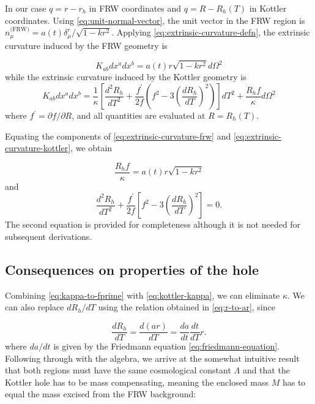 In our case $q = r-r_h$ in FRW coordinates and $q = R - R_h(T)$ in Kottler coordinates. Using \autoref{eq:unit-normal-vector}, the unit vector in the FRW region is $n_{\mu}^{\text{(FRW)}} = a(t) \delta^r_{\mu}/\sqrt{1-kr^2}$. Applying \autoref{eq:extrinsic-curvature-defn}, the extrinsic curvature induced by the FRW geometry is

\begin{equation}
  K_{ab} dx^a dx^b = a(t)r \sqrt{1-kr^2} d \Omega^2
  \label{eq:extrinsic-curvature-frw}
\end{equation}
while the extrinsic curvature induced by the Kottler geometry is
\begin{equation}
  K_{ab} dx^a dx^b = \frac{1}{\kappa} \left [ \frac{d^2R_h}{dT^2} + \frac{f^{\prime}}{2f}\left (f^2 - 3 \left (\frac{dR_h}{dT}\right )^2 \right) \right] dT^2 + \frac{R_h f}{\kappa} d \Omega^2
  \label{eq:extrinsic-curvature-kottler}
\end{equation}
where $f^{\prime} = \partial f / \partial R$, and all quantities are evaluated at $R = R_h(T)$.

Equating the components of \autoref{eq:extrinsic-curvature-frw} and \autoref{eq:extrinsic-curvature-kottler}, we obtain

\begin{equation}
  \frac{R_h f}{\kappa} = a(t)r\sqrt{1-kr^2}
  \label{eq:kappa-to-fprime}
\end{equation}
and
\begin{equation}
  \frac{d^2R_h}{dT^2} + \frac{f^{\prime}}{2f}\left [f^2 - 3 \left (\frac{dR_h}{dT}\right )^2 \right ] = 0.
\end{equation}
The second equation is provided for completeness although it is not needed for subsequent derivations. 

\subsection{Consequences on properties of the hole}

Combining \autoref{eq:kappa-to-fprime} with \autoref{eq:kottler-kappa}, we can eliminate $\kappa$. We can also replace $dR_h/dT$ using the relation obtained in \autoref{eq:r-to-ar}, since

\begin{equation}
  \frac{dR_h}{dT} = \frac{d(ar)}{dT} = \frac{da}{dt}\frac{dt}{dT}r.
\end{equation}
where $da/dt$ is given by the Friedmann equation \ref{eq:friedmann-equation}. Following through with the algebra, we arrive at the somewhat intuitive result that both regions must have the same cosmological constant $\Lambda$ and that the Kottler hole has to be mass compensating, meaning the enclosed mass $M$ has to equal the mass excised from the FRW background:

